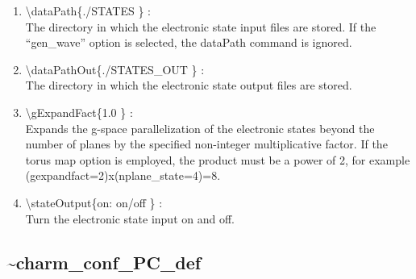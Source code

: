 \documentclass[12pt,titlepage]{article}
\begin{document}
\begin{enumerate}
  \vspace{0.15in} 
  \item \textbackslash{}dataPath\{./STATES \} : \\    
  The directory in which the electronic state input files are
  stored. If the ``gen\_wave'' option is selected, the dataPath
  command is ignored.
  \vspace{0.15in} 
  \item \textbackslash{}dataPathOut\{./STATES\_OUT \} : \\    
  The directory in which the electronic state output files are stored.
  \vspace{0.15in} 
  \item \textbackslash{}gExpandFact\{1.0 \} : \\    
  Expands the g-space parallelization of the electronic states beyond the number of planes by
  the specified non-integer multiplicative factor. If the torus map option is
  employed, the product must be a power of 2, for example 
 (gexpandfact=2)x(nplane\_state=4)=8.
  \vspace{0.15in} 
  \item \textbackslash{}stateOutput\{on: on/off \} : \\    
  Turn the electronic state input on and off.
\end{enumerate}

\newpage
\subsection*{\bf \~{ }charm\_conf\_PC\_def}
\end{document}
